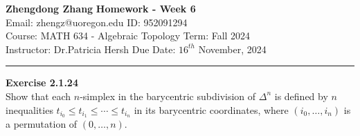 \documentclass[a4paper, 12pt]{article}
\newenvironment{problem}[2][Exercise]
    { \begin{mdframed}[backgroundcolor=gray!20] \textbf{#1 #2} \\}
    {  \end{mdframed}}
\begin{document}
\noindent
\large\textbf{Zhengdong Zhang} \hfill \textbf{Homework - Week 6}   \\
Email: zhengz@uoregon.edu \hfill ID: 952091294 \\
\normalsize Course: MATH 634 - Algebraic Topology  \hfill Term: Fall 2024\\
Instructor: Dr.Patricia Hersh \hfill Due Date: $16^{th}$ November, 2024 \\
\noindent\rule{7in}{2.8pt}
\begin{problem}{2.1.24}
Show that each \(n\)-simplex in the barycentric subdivision of \(\Delta^n\) is defined by \(n\) inequalities \(t_{i_0}\leq t_{i_1}\leq \cdots \leq t_{i_n}\) in its 
barycentric coordinates, where \((i_0,\ldots,i_n)\) is a permutation of \((0,\ldots,n)\). 
\end{problem}
\end{document}
